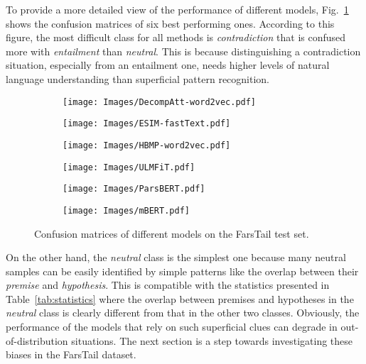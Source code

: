 \documentclass[preprint,12pt]{elsarticle}
\begin{document}
To provide a more detailed view of the performance of different models, Fig.~\ref{fig:confusion} shows the confusion matrices of six best performing ones. According to this figure, the most difficult class for all methods is \textit{contradiction} that is confused more with \textit{entailment} than \textit{neutral}. This is because distinguishing a contradiction situation, especially from an entailment one, needs higher levels of natural language understanding than superficial pattern recognition. 

\begin{figure}[p]


    \begin{subfigure}{0.53\textwidth} 
        \texttt{[image: Images/DecompAtt-word2vec.pdf]}
\end{subfigure}
    \begin{subfigure}{0.43\textwidth} 
        \texttt{[image: Images/ESIM-fastText.pdf]}
\end{subfigure}
    
    \begin{subfigure}{0.53\textwidth}
        \texttt{[image: Images/HBMP-word2vec.pdf]}
\end{subfigure}
    \begin{subfigure}{0.43\textwidth}
        \texttt{[image: Images/ULMFiT.pdf]}
\end{subfigure}
    
    \begin{subfigure}{0.54\textwidth}
        \texttt{[image: Images/ParsBERT.pdf]}
\end{subfigure}
    \begin{subfigure}{0.42\textwidth}
        \texttt{[image: Images/mBERT.pdf]}
\end{subfigure}
    \caption{Confusion matrices of different models on the FarsTail test set.}
    \label{fig:confusion}
\end{figure}

On the other hand, the \textit{neutral} class is the simplest one because many neutral samples can be easily identified by simple patterns like the overlap between their \textit{premise} and \textit{hypothesis}. This is compatible with the statistics presented in Table~\ref{tab:statistics} where the overlap between premises and hypotheses in the \textit{neutral} class is clearly different from that in the other two classes.
Obviously, the performance of the models that rely on such superficial clues can degrade in out-of-distribution situations. The next section is a step towards investigating these biases in the FarsTail dataset. 
\end{document}
